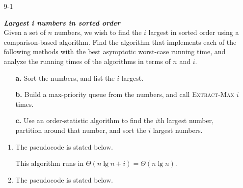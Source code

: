 \begin{enumerate}

\item[9-1]{\textbf{\emph{Largest i numbers in sorted order}}\\
Given a set of $n$ numbers, we wish to find the $i$ largest in sorted order
using a comparison-based algorithm. Find the algorithm that implements each of
the following methods with the best asymptotic worst-case running time, and
analyze the running times of the algorithms in terms of $n$ and $i$.

\begin{enumerate}
  \item[\textbf{a.}] Sort the numbers, and list the $i$ largest.
  \item[\textbf{b.}] Build a max-priority queue from the numbers, and call \textsc{Extract-Max} $i$ times.
  \item[\textbf{c.}] Use an order-statistic algorithm to find the $i$th largest number,
    partition around that number, and sort the $i$ largest numbers.
\end{enumerate}
}

\begin{framed}
\begin{enumerate}
\item The pseudocode is stated below.

\begin{algorithm}[H]
\SetAlgoNoEnd\DontPrintSemicolon
\BlankLine
{}
\nonl{}
\end{algorithm}

    This algorithm runs in $\Theta(n \lg n + i) = \Theta(n \lg n)$.

\item The pseudocode is stated below.

\begin{algorithm}[H]
\SetAlgoNoEnd\DontPrintSemicolon
\BlankLine
{}
\nonl{}
\end{algorithm}


\end{enumerate}
\end{framed}
\end{enumerate}
